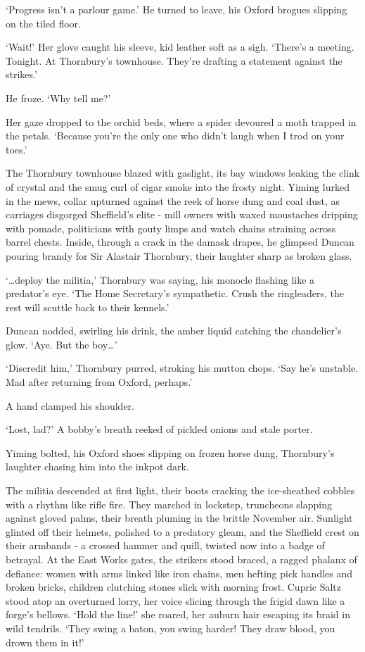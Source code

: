 `Progress isn't a parlour game.' He turned to leave, his Oxford brogues slipping on the tiled floor.

`Wait!' Her glove caught his sleeve, kid leather soft as a sigh. `There's a meeting. Tonight. At Thornbury's townhouse. They're drafting a statement against the strikes.'

He froze. `Why tell me?'

Her gaze dropped to the orchid beds, where a spider devoured a moth trapped in the petals. `Because you're the only one who didn't laugh when I trod on your toes.'

The Thornbury townhouse blazed with gaslight, its bay windows leaking the clink of crystal and the smug curl of cigar smoke into the frosty night. Yiming lurked in the mews, collar upturned against the reek of horse dung and coal dust, as carriages disgorged Sheffield's elite - mill owners with waxed moustaches dripping with pomade, politicians with gouty limps and watch chains straining across barrel chests. Inside, through a crack in the damask drapes, he glimpsed Duncan pouring brandy for Sir Alastair Thornbury, their laughter sharp as broken glass.

`\dots deploy the militia,' Thornbury was saying, his monocle flashing like a predator's eye. `The Home Secretary's sympathetic. Crush the ringleaders, the rest will scuttle back to their kennels.'

Duncan nodded, swirling his drink, the amber liquid catching the chandelier's glow. `Aye. But the boy\dots'

`Discredit him,' Thornbury purred, stroking his mutton chops. `Say he's unstable. Mad after returning from Oxford, perhaps.'

A hand clamped his shoulder.

`Lost, lad?' A bobby's breath reeked of pickled onions and stale porter.

Yiming bolted, his Oxford shoes slipping on frozen horse dung, Thornbury's laughter chasing him into the inkpot dark.

The militia descended at first light, their boots cracking the ice-sheathed cobbles with a rhythm like rifle fire. They marched in lockstep, truncheons slapping against gloved palms, their breath pluming in the brittle November air. Sunlight glinted off their helmets, polished to a predatory gleam, and the Sheffield crest on their armbands - a crossed hammer and quill, twisted now into a badge of betrayal. At the East Works gates, the strikers stood braced, a ragged phalanx of defiance: women with arms linked like iron chains, men hefting pick handles and broken bricks, children clutching stones slick with morning frost. Cupric Saltz stood atop an overturned lorry, her voice slicing through the frigid dawn like a forge's bellows. `Hold the line!' she roared, her auburn hair escaping its braid in wild tendrils. `They swing a baton, you swing harder! They draw blood, you drown them in it!'


